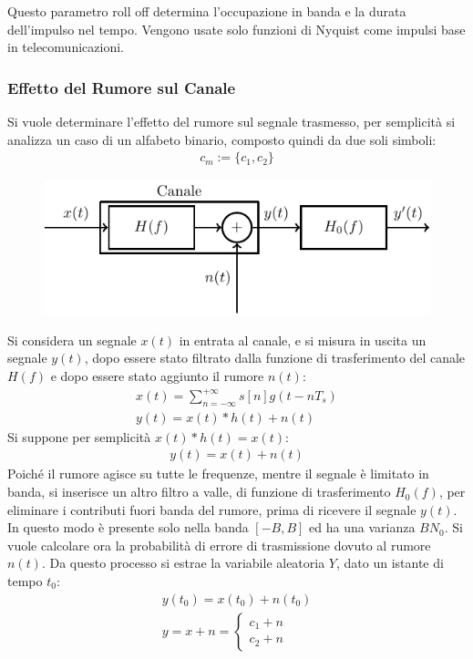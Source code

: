 \documentclass{article}
\numberwithin{equation}{subsection}
\begin{document}
Questo parametro roll off determina l'occupazione in banda e la durata dell'impulso nel tempo. Vengono usate solo funzioni di Nyquist come impulsi base 
in telecomunicazioni. 

\subsubsection{Effetto del Rumore sul Canale}

Si vuole determinare l'effetto del rumore sul segnale trasmesso, per semplicità si analizza un caso di un alfabeto binario, composto quindi da due soli simboli:
\begin{gather*}
    c_m:=\biggl\{c_1,c_2\biggr\}
\end{gather*}
\begin{figure}[H]%
    \centering
    \includegraphics{modulatore.pdf}
\end{figure}   
Si considera un segnale $x(t)$ in entrata al canale, e si misura in uscita un segnale $y(t)$, dopo essere stato filtrato dalla funzione di trasferimento del canale $H(f)$ 
e dopo essere stato aggiunto il rumore $n(t)$:
\begin{gather*}
    x(t)=\displaystyle\sum_{n=-\infty}^{+\infty}s[n]g(t-nT_s)\\
    y(t)=x(t)*h(t)+n(t)
\end{gather*}
Si suppone per semplicità $x(t)*h(t)=x(t)$:
\begin{gather*}
    y(t)=x(t)+n(t)
\end{gather*}
Poiché il rumore agisce su tutte le frequenze, mentre il segnale è limitato in banda, si inserisce un altro filtro a valle, di funzione di trasferimento $H_0(f)$, per 
eliminare i contributi fuori banda del rumore, prima di ricevere il segnale $y(t)$.
In questo modo è presente solo nella banda $[-B,B]$ ed ha una varianza $BN_0$. Si vuole calcolare ora la probabilità di errore di trasmissione dovuto al rumore $n(t)$. 
Da questo processo si estrae la variabile aleatoria $Y$, dato un istante di tempo $t_0$:
\begin{gather*}
    y(t_0)=x(t_0)+n(t_0)\\
    y=x+n=\begin{cases}
        c_1+n\\
        c_2+n
    \end{cases}
\end{gather*}
\end{document}
